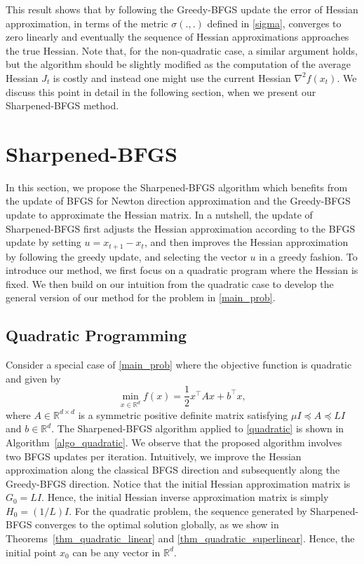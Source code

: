 \documentclass[11pt]{article}
\numberwithin{assumption}{section}
\numberwithin{remark}{section}
\numberwithin{theorem}{section}
\begin{document}
This result shows that by following the Greedy-BFGS update the error of Hessian approximation, in terms of the metric $\sigma(.,.)$ defined in \eqref{sigma}, converges to zero linearly and eventually the sequence of Hessian approximations approaches the true Hessian. Note that, for the non-quadratic case, a similar argument holds, but the algorithm should be slightly modified as the computation of the average Hessian $J_t$ is costly and instead one might use the current Hessian $\nabla^2 f(x_t)$. We discuss this point in detail in the following section, when we present our Sharpened-BFGS method.

\section{Sharpened-BFGS}\label{sec:main}

In this section, we propose the Sharpened-BFGS algorithm which benefits from the update of BFGS for Newton direction approximation and the Greedy-BFGS update to approximate the Hessian matrix. In a nutshell, the update of Sharpened-BFGS first adjusts the Hessian approximation according to the BFGS update by setting $u=x_{t+1}-x_t$, and then improves the Hessian approximation by following the greedy update, and selecting the vector $u$ in a greedy fashion. To introduce our method, we first focus on a quadratic program where the Hessian is fixed. We then build on our intuition from the quadratic case to develop the general version of our method for the problem in \eqref{main_prob}.

\subsection{Quadratic Programming}\label{sec:quadratic}

Consider a special case of \eqref{main_prob} where the objective function is quadratic and given by
\begin{equation}\label{quadratic}
    \min_{x \in \mathbb{R}^d} f(x) = \frac{1}{2}x^\top A x + b^\top x,
\end{equation}
where $A \in \mathbb{R}^{d \times d}$ is a symmetric positive definite matrix satisfying $\mu I \preceq A \preceq LI$ and $b \in \mathbb{R}^d$. The Sharpened-BFGS algorithm applied to \eqref{quadratic} is shown in Algorithm~\ref{algo_quadratic}. We observe that the proposed algorithm involves two BFGS updates per iteration. Intuitively, we improve the Hessian approximation along the classical BFGS direction and subsequently along the Greedy-BFGS direction. Notice that the initial Hessian approximation matrix is $G_0 = LI$. Hence, the initial Hessian inverse approximation matrix is simply $H_0 = ({1}/{L})I$. For the quadratic problem, the sequence generated by Sharpened-BFGS converges to the optimal solution globally, as we show in Theorems~\ref{thm_quadratic_linear} and \ref{thm_quadratic_superlinear}. Hence, the initial point $x_0$ can be any vector in $\mathbb{R}^d$.
\end{document}
